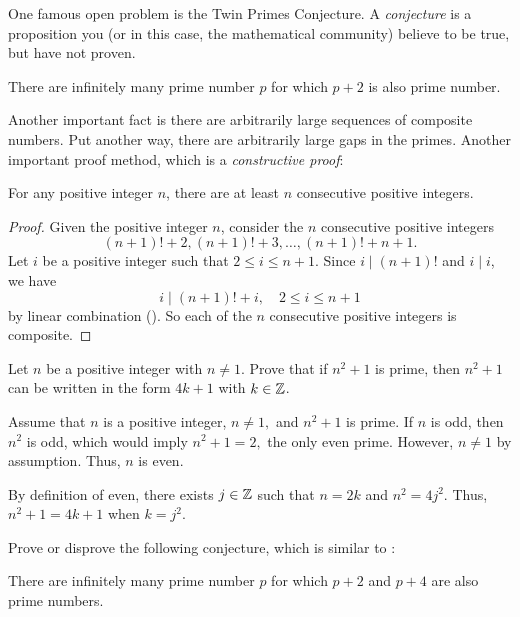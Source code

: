 \documentclass{ximera}
\begin{document}
One famous open problem is the Twin Primes Conjecture. A \emph{conjecture} is a proposition you (or in this case, the mathematical community) believe to be true, but have not proven.

\begin{conjecture}\label{conj:twin-primes}
  There are infinitely many prime number $p$ for which $p+2$ is also prime number.
\end{conjecture}

Another important fact is there are arbitrarily large sequences of composite numbers. Put another way, there are arbitrarily large gaps in the primes. Another important proof method, which is a \emph{constructive proof}:

\begin{theorem}\label{prop:gaps-primes}
 For any positive integer $n$, there are at least $n$ consecutive positive integers.
\end{theorem}
\begin{proof}
 Given the positive integer $n$, consider the $n$ consecutive positive integers \[(n+1)!+2, (n+1)!+3,\dots, (n+1)!+n+1.\]
 Let $i$ be a positive integer such that $2\leq i\leq n+1$. Since $i\mid (n+1)!$ and $i\mid i$, we have \[i\mid(n+1)! +i,\quad 2\leq i\leq n+1\] by linear combination (). So each of the $n$ consecutive positive integers is composite.
\end{proof}

  \begin{br} Let $n$ be a positive integer with $n\neq 1$. Prove that if $n^2+1$ is prime, then $n^2+1$ can be written in the form $4k+1$ with $k\in\mathbb Z$.
  \begin{solution}
   Assume that $n$ is a positive integer, $n\neq 1,$ and $n^2+1$ is prime. If $n$ is odd, then $n^2$ is odd, which would imply $n^2+1=2,$ the only even prime. However, $n\neq 1$ by assumption. Thus, $n$ is even. 

    By definition of even, there exists $j\in\mathbb Z$ such that $n=2k$ and $n^2=4j^2$. Thus, $n^2+1=4k+1$ when $k=j^2.$
  \end{solution}
\end{br}

  \begin{br}
    Prove or disprove the following conjecture, which is similar to :

    \begin{conjecture}
      There are infinitely many prime number $p$ for which $p+2$ and $p+4$ are also prime numbers.
    \end{conjecture}
    \end{br}



\end{document}
